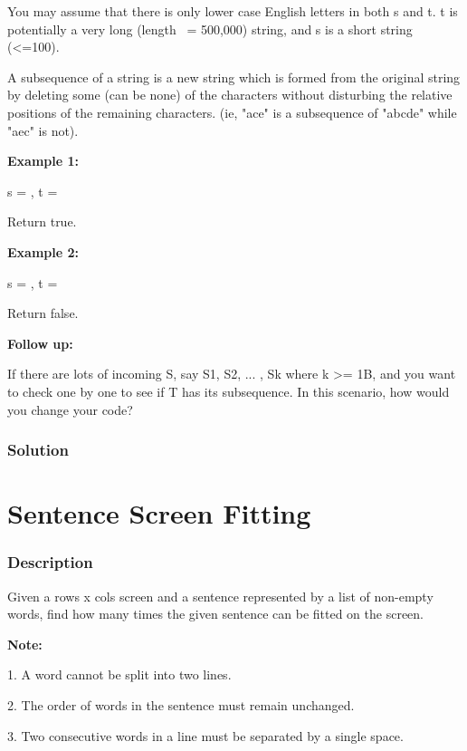 You may assume that there is only lower case English letters in both s and t. t is potentially a very long (length ~= 500,000) string, and s is a short string (<=100).

A subsequence of a string is a new string which is formed from the original string by deleting some (can be none) of the characters without disturbing the relative positions of the remaining characters. (ie, "ace" is a subsequence of "abcde" while "aec" is not).

\textbf{Example 1:}

s = , t = 

Return true.

\textbf{Example 2:}

s = , t = 

Return false.

\textbf{Follow up:}

If there are lots of incoming S, say S1, S2, ... , Sk where k >= 1B, and you want to check one by one to see if T has its subsequence. In this scenario, how would you change your code?
\subsubsection{Solution}

\begin{Code}

\end{Code}

\newpage

\section{Sentence Screen Fitting} %

\subsubsection{Description}
Given a rows x cols screen and a sentence represented by a list of non-empty words, find how many times the given sentence can be fitted on the screen.

\textbf{Note:}

1. A word cannot be split into two lines.

2. The order of words in the sentence must remain unchanged.

3. Two consecutive words in a line must be separated by a single space.

